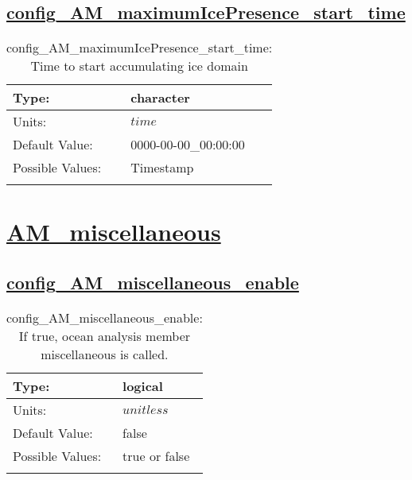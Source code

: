 \subsection[config\_AM\_maximumIcePresence\_start\_time]{\hyperref[sec:nm_tab_AM_maximumIcePresence]{config\_AM\_maximumIcePresence\_start\_time}}
\label{subsec:nm_sec_config_AM_maximumIcePresence_start_time}
\begin{center}
\begin{longtable}{| p{2.0in} || p{4.0in} |}
    \hline
    Type: & character \\
    \hline
    Units: & $time$ \\
    \hline
    Default Value: & 0000-00-00\_00:00:00 \\
    \hline
    Possible Values: & Timestamp \\
    \hline
    \caption{config\_AM\_maximumIcePresence\_start\_time: Time to start accumulating ice domain}
\end{longtable}
\end{center}
\section[AM\_miscellaneous]{\hyperref[sec:nm_tab_AM_miscellaneous]{AM\_miscellaneous}}
\label{sec:nm_sec_AM_miscellaneous}
\subsection[config\_AM\_miscellaneous\_enable]{\hyperref[sec:nm_tab_AM_miscellaneous]{config\_AM\_miscellaneous\_enable}}
\label{subsec:nm_sec_config_AM_miscellaneous_enable}
\begin{center}
\begin{longtable}{| p{2.0in} || p{4.0in} |}
    \hline
    Type: & logical \\
    \hline
    Units: & $unitless$ \\
    \hline
    Default Value: & false \\
    \hline
    Possible Values: & true or false \\
    \hline
    \caption{config\_AM\_miscellaneous\_enable: If true, ocean analysis member miscellaneous is called.}
\end{longtable}
\end{center}
